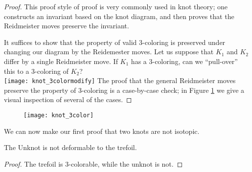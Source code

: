 \begin{proof}
This proof style of proof is very commonly used in knot theory; one constructs an invariant based on the knot diagram, and then proves that the Reidmeister moves preserve the invariant. 

It suffices to show that the property of valid 3-coloring is preserved under changing our diagram by the Reidemester moves. Let us suppose that $K_1$ and $K_2$ differ by a single Reidmeister move. If $K_1$ has a 3-coloring, can we ``pull-over'' this to a $3$-coloring of $K_2$? \\
 {\texttt{[image: knot\_3colormodify]}} The proof that the general Reidmeister moves preserve the property of 3-coloring is a case-by-case check; in Figure \ref{fig:knot_3color} we give a visual inspection of several of the cases. 
\end{proof}
\begin{figure}
\centering
\texttt{[image: knot\_3color]}
\label{fig:knot_3color}
\end{figure}
We can now make our first proof that two knots are not isotopic. 
\begin{corollary} 
The Unknot is not deformable to the trefoil.
\end{corollary}
\begin{proof}
 The trefoil is 3-colorable, while the unknot is not. 
\end{proof}

